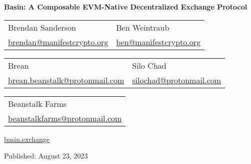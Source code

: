 \documentclass[tikz]{article}
\newcommand{\BasinCover}{} %
\begin{document}
\thispagestyle{empty} %
\begin{titlepage}
\begin{center}
\vspace*{-0.1cm}
\begin{changemargin}{-1.0cm}{-1.0cm}
\centering %
\textbf{\Large{Basin: A Composable EVM-Native Decentralized Exchange Protocol}}
\end{changemargin}
\begin{center}
\BasinCover
\end{center}
\vspace{0.4cm}

\begin{center}
    \begin{tabular}{>{\centering\arraybackslash}p{5cm} >{\centering\arraybackslash}p{5cm}}
        \large{Brendan Sanderson} & \large{Ben Weintraub} \\
        \href{mailto:brendan@manifestcrypto.org}{\normalsize{brendan@manifestcrypto.org}} & \href{mailto:ben@manifestcrypto.org}{\normalsize{ben@manifestcrypto.org}}
    \end{tabular}
\end{center}

\begin{center}
    \begin{tabular}{>{\centering\arraybackslash}p{5cm} >{\centering\arraybackslash}p{5cm}}
        \large{Brean} & \large{Silo Chad} \\
        \href{mailto:brean.beanstalk@protonmail.com}{\normalsize{brean.beanstalk@protonmail.com}} & \href{mailto:silochad@protonmail.com}{\normalsize{silochad@protonmail.com}}
    \end{tabular}
\end{center}

\begin{center}
    \begin{tabular}{>{\centering\arraybackslash}p{10cm}}
        \large{Beanstalk Farms} \\
        \href{mailto:beanstalkfarms@protonmail.com}{\normalsize{beanstalkfarms@protonmail.com}}
    \end{tabular}
\end{center}

\normalsize{\href{https://basin.exchange/}{basin.exchange}}

\vspace{0.4cm}
\footnotesize{Published:} \normalsize{August 23, 2023}


\end{center}
\end{titlepage}
\end{document}
